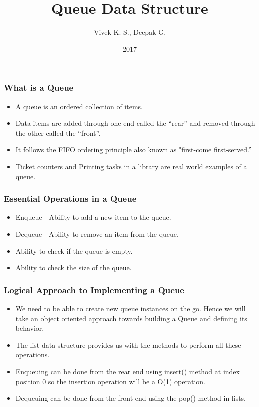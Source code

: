 \documentclass{beamer}
\title{Queue Data Structure}
\author{Vivek K. S., Deepak G.}
\institute{Information Systems Decision Sciences (ISDS)\\
MUMA College of Business\\
University of South Florida \\
Tampa, Florida}
\date{2017}
\begin{document}
 
\frame{\titlepage}
 
\begin{frame}
\frametitle{What is a Queue}
\begin{itemize}

\item A queue is an ordered collection of items.

\item Data items are added through one end called the “rear” and removed through the other called the “front”.


\item It follows the FIFO ordering principle also known as "first-come first-served.”
 

\item Ticket counters and Printing tasks in a library are real world examples of a queue.


\end{itemize}
\end{frame}


\begin{frame}
\frametitle{Essential Operations in a Queue}
\begin{itemize}

\item Enqueue - Ability to add a new item to the queue.

\item Dequeue - Ability to remove an item from the queue.

\item Ability to check if the queue is empty.

\item Ability to check the size of the queue.


\end{itemize}
\end{frame}

\begin{frame}
\frametitle{Logical Approach to Implementing a Queue}
\begin{itemize}

\item We need to be able to create new queue instances on the go. Hence we will take an object oriented approach towards building a Queue and defining its behavior.

\item The list data structure provides us with the methods to perform all these operations.

\item Enqueuing can be done from the rear end using insert() method at index position 0 so the insertion operation will be a O(1) operation.

\item Dequeuing can be done from the front end using the pop() method in lists.

\end{itemize}
\end{frame}
\end{document}

